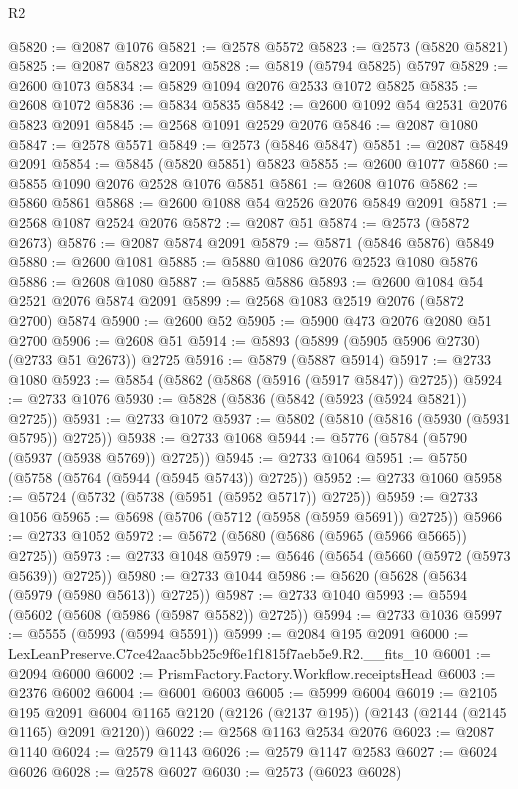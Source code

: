 \begin{lexlean}{R2}
\begin{coremodule}
@5820 := @2087 @1076
@5821 := @2578 @5572
@5823 := @2573 (@5820 @5821)
@5825 := @2087 @5823 @2091
@5828 := @5819 (@5794 @5825) @5797
@5829 := @2600 @1073
@5834 := @5829 @1094 @2076 @2533 @1072 @5825
@5835 := @2608 @1072
@5836 := @5834 @5835
@5842 := @2600 @1092 @54 @2531 @2076 @5823 @2091
@5845 := @2568 @1091 @2529 @2076
@5846 := @2087 @1080
@5847 := @2578 @5571
@5849 := @2573 (@5846 @5847)
@5851 := @2087 @5849 @2091
@5854 := @5845 (@5820 @5851) @5823
@5855 := @2600 @1077
@5860 := @5855 @1090 @2076 @2528 @1076 @5851
@5861 := @2608 @1076
@5862 := @5860 @5861
@5868 := @2600 @1088 @54 @2526 @2076 @5849 @2091
@5871 := @2568 @1087 @2524 @2076
@5872 := @2087 @51
@5874 := @2573 (@5872 @2673)
@5876 := @2087 @5874 @2091
@5879 := @5871 (@5846 @5876) @5849
@5880 := @2600 @1081
@5885 := @5880 @1086 @2076 @2523 @1080 @5876
@5886 := @2608 @1080
@5887 := @5885 @5886
@5893 := @2600 @1084 @54 @2521 @2076 @5874 @2091
@5899 := @2568 @1083 @2519 @2076 (@5872 @2700) @5874
@5900 := @2600 @52
@5905 := @5900 @473 @2076 @2080 @51 @2700
@5906 := @2608 @51
@5914 := @5893 (@5899 (@5905 @5906 @2730) (@2733 @51 @2673)) @2725
@5916 := @5879 (@5887 @5914)
@5917 := @2733 @1080
@5923 := @5854 (@5862 (@5868 (@5916 (@5917 @5847)) @2725))
@5924 := @2733 @1076
@5930 := @5828 (@5836 (@5842 (@5923 (@5924 @5821)) @2725))
@5931 := @2733 @1072
@5937 := @5802 (@5810 (@5816 (@5930 (@5931 @5795)) @2725))
@5938 := @2733 @1068
@5944 := @5776 (@5784 (@5790 (@5937 (@5938 @5769)) @2725))
@5945 := @2733 @1064
@5951 := @5750 (@5758 (@5764 (@5944 (@5945 @5743)) @2725))
@5952 := @2733 @1060
@5958 := @5724 (@5732 (@5738 (@5951 (@5952 @5717)) @2725))
@5959 := @2733 @1056
@5965 := @5698 (@5706 (@5712 (@5958 (@5959 @5691)) @2725))
@5966 := @2733 @1052
@5972 := @5672 (@5680 (@5686 (@5965 (@5966 @5665)) @2725))
@5973 := @2733 @1048
@5979 := @5646 (@5654 (@5660 (@5972 (@5973 @5639)) @2725))
@5980 := @2733 @1044
@5986 := @5620 (@5628 (@5634 (@5979 (@5980 @5613)) @2725))
@5987 := @2733 @1040
@5993 := @5594 (@5602 (@5608 (@5986 (@5987 @5582)) @2725))
@5994 := @2733 @1036
@5997 := @5555 (@5993 (@5994 @5591))
@5999 := @2084 @195 @2091
@6000 := LexLeanPreserve.C7ce42aac5bb25c9f6e1f1815f7aeb5e9.R2.__fits_10
@6001 := @2094 @6000
@6002 := PrismFactory.Factory.Workflow.receiptsHead
@6003 := @2376 @6002
@6004 := @6001 @6003
@6005 := @5999 @6004
@6019 := @2105
    @195
    @2091
    @6004
    @1165
    @2120
    (@2126 (@2137 @195))
    (@2143 (@2144 (@2145 @1165) @2091 @2120))
@6022 := @2568 @1163 @2534 @2076
@6023 := @2087 @1140
@6024 := @2579 @1143
@6026 := @2579 @1147 @2583
@6027 := @6024 @6026
@6028 := @2578 @6027
@6030 := @2573 (@6023 @6028)

\end{coremodule}
\end{lexlean}
